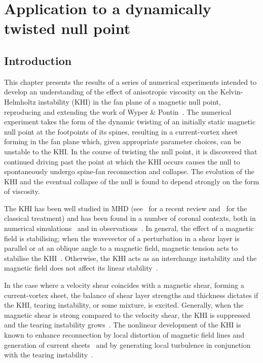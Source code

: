 \chapter{Application to a dynamically twisted null point}
\label{chp:null_point_khi}

\graphicspath{{images/null_point_khi/}}

\section{Introduction}

This chapter presents the results of a series of numerical experiments intended to develop an understanding of the effect of anisotropic viscosity on the Kelvin-Helmholtz instability (KHI) in the fan plane of a magnetic null point, reproducing and extending the work of Wyper \& Pontin~\cite{wyperKelvinHelmholtzInstabilityCurrentvortex2013}. The numerical experiment takes the form of the dynamic twisting of an initially static magnetic null point at the footpoints of its spines, resulting in a current-vortex sheet forming in the fan plane which, given appropriate parameter choices, can be unstable to the KHI. In the course of twisting the null point, it is discovered that continued driving past the point at which the KHI occurs causes the null to spontaneously undergo spine-fan reconnection and collapse. The evolution of the KHI and the eventual collapse of the null is found to depend strongly on the form of viscosity.

The KHI has been well studied in MHD (see~\cite{faganelloMagnetizedKelvinHelmholtz2017} for a recent review and~\cite{chandrasekharHydrodynamicHydromagneticStability1981} for the classical treatment) and has been found in a number of coronal contexts, both in numerical simulations~\cite{howsonEffectsResistivityViscosity2017,wyperKelvinHelmholtzInstabilityCurrentvortex2013} and in observations~\cite{foullonMAGNETICKELVINHELMHOLTZINSTABILITY2011,yangObservationKelvinHelmholtz2018}.  In general, the effect of a magnetic field is stabilising; when the wavevector of a perturbation in a shear layer is parallel or at an oblique angle to a magnetic field, magnetic tension acts to stabilise the KHI~\cite{chandrasekharHydrodynamicHydromagneticStability1981,ryuMagnetohydrodynamicKelvinHelmholtzInstability2000}. Otherwise, the KHI acts as an interchange instability and the magnetic field does not affect its linear stability~\cite{chandrasekharHydrodynamicHydromagneticStability1981}.

In the case where a velocity shear coincides with a magnetic shear, forming a current-vortex sheet, the balance of shear layer strengths and thickness dictates if the KHI, tearing instability, or some mixture, is excited. Generally, when the magnetic shear is strong compared to the velocity shear, the KHI is suppressed and the tearing instability grows~\cite{einaudiResistiveInstabilitiesFlowing1986}. The nonlinear development of the KHI is known to enhance reconnection by local distortion of magnetic field lines and generation of current sheets~\cite{minEffectsMagneticReconnection1997} and by generating local turbulence in conjunction with the tearing instability~\cite{kowalKelvinHelmholtzTearingInstability2020}.

